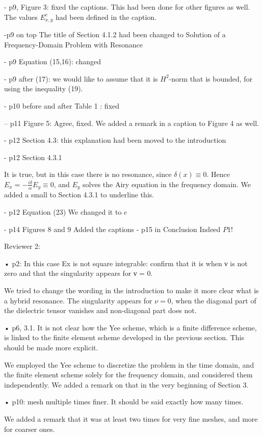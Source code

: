 \documentclass[a4paper,10pt]{article}
\begin{document}
 -  p9, Figure 3: fixed the captions. This had been done for other figures as well. The values $E^{c}_{x,y}$ had been defined in the caption.
 
 -p9 on top
  The title of Section 4.1.2 had been changed to Solution of a Frequency-Domain Problem with Resonance
  
 - p9 Equation (15,16): changed  

 - p9 after (17): we would like to assume that it is $H^2$-norm that is bounded, for using the inequality (19). 
  
 - p10 before and after Table 1 : fixed
 
 -- p11 Figure 5:
Agree, fixed. We added a remark in a caption to Figure 4 as well.



- p12 Section 4.3: this explanation had been moved to the introduction



- p12 Section 4.3.1

  It is true, but in this case there is no resonance, since $\delta(x)\equiv 0$. Hence $E_x=-\frac{i\delta}{\alpha}E_y\equiv 0$, 
  and $E_y$ solves the Airy equation in the frequency domain. We added a small to Section 4.3.1 to underline this. 

  
- p12 Equation (23)
We changed it to $e$
  
- p14 Figures 8 and 9
Added the captions  
- p15 in Conclusion
  Indeed $P1$!
  

 Reviewer 2:
 
 • p2: In this case Ex is not square integrable: confirm that it is when ν is not zero and that
the singularity appears for ν = 0.

We tried to change the wording in the introduction to make it more clear what is a hybrid resonance. 
The singularity appears for $\nu=0$, when the diagonal part of the dielectric tensor vanishes and non-diagonal part does not. 

• p6, 3.1. It is not clear how the Yee scheme, which is a finite difference scheme, is linked to the
finite element scheme developed in the previous section. This should be made more explicit.

We employed the Yee scheme to discretize the problem in the time domain, and the finite element scheme solely for the frequency domain, 
and considered them independently. We added a remark on that in the very beginning of Section 3. 

• p10: mesh multiple times finer. It should be said exactly how many times. 

We added a remark that it was at least two times for very fine meshes, and more for coarser ones.


  
 
\end{document}
